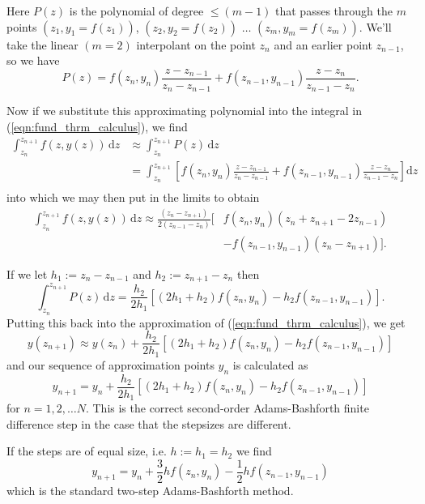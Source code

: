     Here $P(z)$ is the polynomial of degree $\le (m-1)$ that passes through the
    $m$ points $(z_1, y_1 = f(z_1))$, $(z_2, y_2 = f(z_2))$ $\dots$ $(z_m, y_m =
    f(z_m))$. We'll take the linear $(m = 2)$ interpolant on the point $z_{n}$
    and an earlier point $z_{n-1}$, so we have
    \begin{equation}
      P(z) = f(z_n, y_n)\frac{z - z_{n-1}}{z_n - z_{n-1}} + 
            f(z_{n-1}, y_{n-1})\frac{z - z_{n}}{z_{n-1} - z_n}.
    \end{equation}

    Now if we substitute this approximating polynomial into the integral in
    (\ref{eqn:fund_thrm_calculus}), we find
    \begin{align*}
      \int_{z_n}^{z_{n+1}} \! f(z,y(z)) \, \mathrm{d}z 
      &\approx \int_{z_n}^{z_{n+1}} \! P(z) \, \mathrm{d}z \\
      &= \int_{z_n}^{z_{n+1}} \! \left[ f(z_n, y_n)\frac{z - z_{n-1}}{z_n - 
      z_{n-1}} + f(z_{n-1}, y_{n-1})\frac{z - z_{n}}{z_{n-1} - z_n} \right] 
      \mathrm{d}z \\
    \end{align*}
    into which we may then put in the limits to obtain
    \begin{align}
      \int_{z_n}^{z_{n+1}} \! f(z,y(z)) \, \mathrm{d}z 
      \approx \frac{(z_n - z_{n+1})}{2(z_{n-1}-z_n)} \Big[ & f(z_n,y_n)(z_n + 
      z_{n+1} - 2z_{n-1}) \nonumber \\ 
        & - f(z_{n-1},y_{n-1})(z_n - z_{n+1}) \Big].
    \end{align}

    If we let $h_1 := z_n - z_{n-1}$ and $h_2 := z_{n+1} - z_n$ then
    \begin{equation*}
      \int_{z_n}^{z_{n+1}} \! P(z) \, \mathrm{d}z = \frac{h_2}{2 h_1} 
      \left[ (2 h_1 + h_2) f(z_n,y_n) - h_2 f(z_{n-1},y_{n-1}) \right].
    \end{equation*}
    Putting this back into the approximation of (\ref{eqn:fund_thrm_calculus}), 
    we get
    \begin{equation*}
      y(z_{n+1}) \approx y(z_{n}) + \frac{h_2}{2 h_1} \left[ (2 h_1 + h_2) 
      f(z_n,y_n)  - h_2 f(z_{n-1},y_{n-1}) \right] 
    \end{equation*}
    and our sequence of approximation points $y_n$ is calculated as
    \begin{equation}\label{eqn:ab_step_different}
      y_{n+1} = y_n + \frac{h_2}{2 h_1} \left[ (2 h_1 + h_2) f(z_n,y_n)  - 
      h_2 f(z_{n-1},y_{n-1}) \right]
    \end{equation}
    for $n = 1, 2, \dots N$. This is the correct second-order Adams-Bashforth 
    finite difference step in the case that the stepsizes are different.

    If the steps are of equal size, i.e. $h := h_1 =
    h_2$ we find
    \begin{equation}\label{eqn:ab_step_standard}
      y_{n+1} = y_n + \frac{3}{2} h f(z_n,y_n) - \frac{1}{2} h f(z_{n-1}, 
      y_{n-1})
    \end{equation}
    which is the standard two-step Adams-Bashforth method\cite{edsberg2008introduction,bashforth1883attempt}.